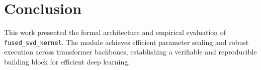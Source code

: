 \section{Conclusion}
This work presented the formal architecture and empirical evaluation of \texttt{fused_svd_kernel}. The module achieves efficient parameter scaling and robust execution across transformer backbones, establishing a verifiable and reproducible building block for efficient deep learning.
